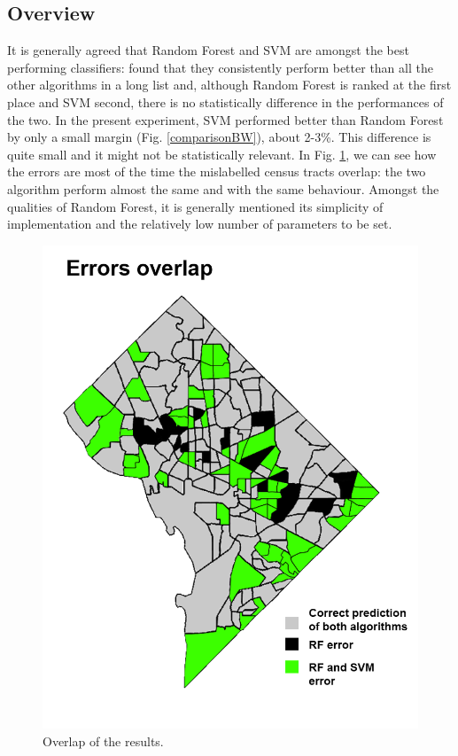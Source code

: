 \documentclass [a4paper,12 pt]{article}
\begin{document}
\subsection{Overview}


It is generally agreed that Random Forest and SVM are amongst the best performing classifiers:  \cite{Fernandez2014we} found that they consistently perform better than all the other algorithms in a long list and, although Random Forest is ranked at the first place and SVM second, there is no statistically difference in the performances of the two.  In the present experiment, SVM performed better than Random Forest by only a small margin (Fig. \ref{comparisonBW}), about 2-3\%. This difference is quite small and it might not be statistically relevant. In Fig. \ref{overlap}, we can see how the errors are most of the time the mislabelled census tracts overlap: the two algorithm perform almost the same and with the same behaviour. Amongst the qualities of Random Forest, it is generally mentioned its simplicity of implementation and the relatively low number of parameters to be set.

\begin{figure}
\begin{center}

\includegraphics[viewport=0 0 800 1029,clip,scale=0.32]{Figures/error_comparison_overlap.png}
\caption{Overlap of the results.}\label{overlap}				
\end{center}
\end{figure}
\end{document}
